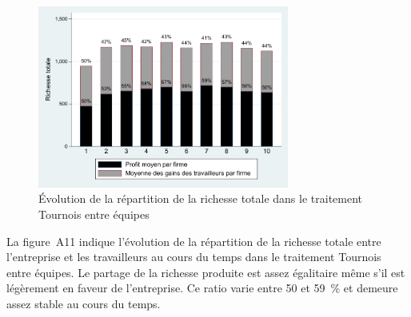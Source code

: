 \begin{Article}
\begin{refsection}[Lebourges]
\begin{appendices}
\begin{figure}[h]
    \centering
    \caption{Évolution de la répartition de la richesse totale dans le traitement Tournois entre équipes}
    \includegraphics[height=6cm]{05_graphA11.pdf}
\end{figure}

La figure~A11 indique l'évolution de la répartition de la richesse
totale entre l'entreprise et les travailleurs au cours du temps dans le
traitement Tournois entre équipes. Le partage de la richesse produite
est assez égalitaire même s'il est légèrement en faveur de l'entreprise.
Ce ratio varie entre 50 et 59~\% et demeure assez stable au cours du
temps.

\end{appendices}

\end{refsection}

\end{Article}
